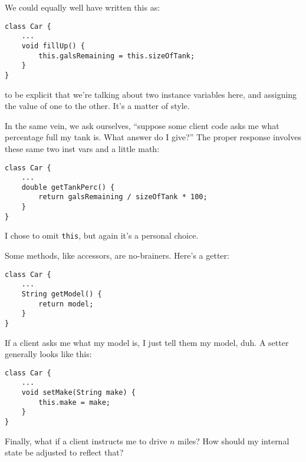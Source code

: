 We could equally well have written this as:

\vspace{-.15in}
\begin{Verbatim}[samepage=true,fontsize=\scriptsize,frame=single]
class Car {
    ...
    void fillUp() {
        this.galsRemaining = this.sizeOfTank;
    }
}
\end{Verbatim}
\vspace{-.15in}

to be explicit that we're talking about two instance variables here, and
assigning the value of one to the other. It's a matter of style.

\medskip

In the same vein, we ask ourselves, ``suppose some client code asks me what
percentage full my tank is. What answer do I give?'' The proper response
involves these same two inst vars and a little math:

\begin{Verbatim}[samepage=true,fontsize=\scriptsize,frame=single]
class Car {
    ...
    double getTankPerc() {
        return galsRemaining / sizeOfTank * 100;
    }
}
\end{Verbatim}
\vspace{-.15in}

I chose to omit \texttt{this}, but again it's a personal choice.
\medskip

Some methods, like accessors, are no-brainers. Here's a getter:

\vspace{-.15in}
\begin{Verbatim}[samepage=true,fontsize=\scriptsize,frame=single]
class Car {
    ...
    String getModel() {
        return model;
    }
}
\end{Verbatim}
\vspace{-.15in}

If a client asks me what my model is, I just tell them my model, duh. A setter
generally looks like this:
\vspace{-.15in}
\begin{Verbatim}[samepage=true,fontsize=\scriptsize,frame=single]
class Car {
    ...
    void setMake(String make) {
        this.make = make;
    }
}
\end{Verbatim}

\medskip

\pagebreak
{}
Finally, what if a client instructs me to drive $n$ miles? How should my
internal state be adjusted to reflect that?

